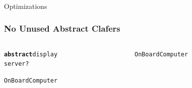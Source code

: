 \documentclass[table,15pt,t]{beamer}
\newcommand{\vmiddle}[1]{
  \vspace{\stretch{1}}
  #1
  \vspace{\stretch{1}}
}
\newcommand{\interframe}[1]{
\begin{frame}{}
\vmiddle{\hmiddle{\Huge #1}}
\end{frame}
}
\newcommand{\hmiddle}[1]{
  \begin{center}#1\end{center}
}
\newcounter{i}
\begin{document}
\interframe{Optimizations}

\begin{frame}[fragile]
  \frametitle{No Unused Abstract Clafers}
  \begin{columns}
    \begin{column}{0.5\textwidth}
      \begin{alltt}
        \begin{small}
\textbf{abstract} \textsf{display}
  \textsf{server} ?

\textsf{OnBoardComputer}
        \end{small}
      \end{alltt}
    \end{column}
\pause
    \begin{column}{0.5\textwidth}
      \begin{alltt}
        \begin{small}
\textsf{OnBoardComputer}
        \end{small}
      \end{alltt}
    \end{column}
  \end{columns}
\end{frame}
\end{document}
